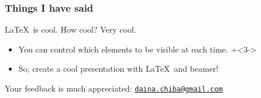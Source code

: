 \documentclass{beamer}
\begin{document}
\begin{frame}
  \frametitle{Things I have said}

    \LaTeX~is cool.
    How cool?
    Very cool.
    \begin{itemize}
        \item You can control which elements to be visible at each time.
  \onslide+<3->
        \item \alert{So, create a cool presentation with \LaTeX~and beamer!}
    \end{itemize}

 \vspace*{1.5cm}
  \onslide
    Your feedback is much appreciated: \href{mailto:daina.chiba@gmail.com}{\texttt{daina.chiba@gmail.com}}

\end{frame}
\end{document}
